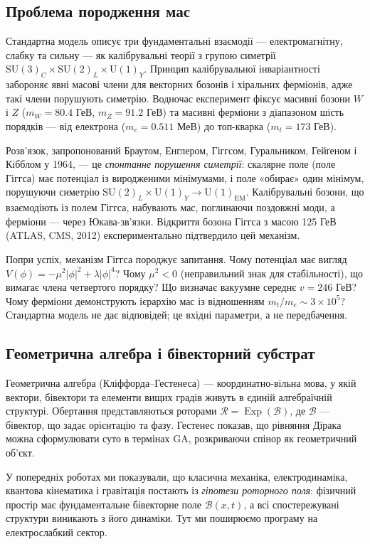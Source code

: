 \documentclass[11pt,a4paper]{article}
\newcommand{\Exp}{\operatorname{Exp}}
\newcommand{\Rotor}{\mathcal{R}}
\newcommand{\Biv}{\mathcal{B}}
\newcommand{\SU}{\mathrm{SU}}
\newcommand{\UU}{\mathrm{U}}
\theoremstyle{definition}
\theoremstyle{plain}
\theoremstyle{remark}
\begin{document}
\subsection{Проблема породження мас}

Стандартна модель описує три фундаментальні взаємодії — електромагнітну, слабку та сильну — як калібрувальні теорії з групою симетрії $\SU(3)_C \times \SU(2)_L \times \UU(1)_Y$. Принцип калібрувальної інваріантності забороняє явні масові члени для векторних бозонів і хіральних ферміонів, адже такі члени порушують симетрію. Водночас експеримент фіксує масивні бозони $W$ і $Z$ ($m_W = 80{.}4$ ГеВ, $m_Z = 91{.}2$ ГеВ) та масивні ферміони з діапазоном шість порядків — від електрона ($m_e = 0{.}511$ МеВ) до топ-кварка ($m_t = 173$ ГеВ).

Розв’язок, запропонований Браутом, Енглером, Гіггсом, Гуральником, Гейґеном і Кібблом у 1964, — це \emph{спонтанне порушення симетрії}: скалярне поле (поле Гіггса) має потенціал із виродженими мінімумами, і поле «обирає» один мінімум, порушуючи симетрію $\SU(2)_L \times \UU(1)_Y \to \UU(1)_{\text{EM}}$. Калібрувальні бозони, що взаємодіють із полем Гіггса, набувають мас, поглинаючи поздовжні моди, а ферміони — через Юкава-зв’язки. Відкриття бозона Гіггса з масою 125 ГеВ (ATLAS, CMS, 2012) експериментально підтвердило цей механізм.

Попри успіх, механізм Гіггса породжує запитання. Чому потенціал має вигляд $V(\phi) = -\mu^2|\phi|^2 + \lambda|\phi|^4$? Чому $\mu^2 < 0$ (неправильний знак для стабільності), що вимагає члена четвертого порядку? Що визначає вакуумне середнє $v = 246$ ГеВ? Чому ферміони демонструють ієрархію мас із відношенням $m_t/m_e \sim 3\times 10^5$? Стандартна модель не дає відповідей; це вхідні параметри, а не передбачення.

\subsection{Геометрична алгебра і бівекторний субстрат}

Геометрична алгебра (Кліффорда–Гестенеса) — координатно-вільна мова, у якій вектори, бівектори та елементи вищих градів живуть в єдиній алгебраїчній структурі. Обертання представляються роторами $\Rotor = \Exp(\Biv)$, де $\Biv$ — бівектор, що задає орієнтацію та фазу. Гестенес показав, що рівняння Дірака можна сформулювати суто в термінах GA, розкриваючи спінор як геометричний об’єкт.

У попередніх роботах ми показували, що класична механіка, електродинаміка, квантова кінематика і гравітація постають із \emph{гіпотези роторного поля}: фізичний простір має фундаментальне бівекторне поле $\Biv(x,t)$, а всі спостережувані структури виникають з його динаміки. Тут ми поширюємо програму на електрослабкий сектор.
\end{document}
